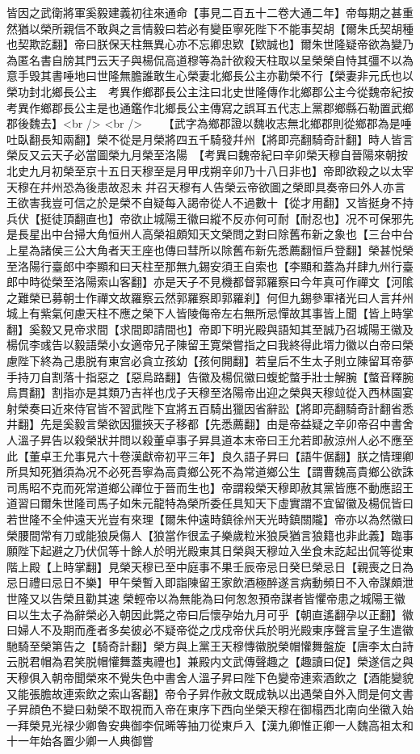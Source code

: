 皆因之武衛將軍奚毅建義初往來通命【事見二百五十二卷大通二年】帝每期之甚重然猶以榮所親信不敢與之言情毅曰若必有變臣寧死陛下不能事契胡【爾朱氏契胡種也契欺訖翻】帝曰朕保天柱無異心亦不忘卿忠欵【欵誠也】爾朱世隆疑帝欲為變乃為匿名書自牓其門云天子與楊侃高道穆等為計欲殺天柱取以呈榮榮自恃其彊不以為意手毁其書唾地曰世隆無膽誰敢生心榮妻北鄉長公主亦勸榮不行【榮妻非元氏也以榮功封北鄉長公主　考異作鄉郡長公主注曰北史世隆傳作北鄉郡公主今從魏帝紀按考異作鄉郡長公主是也通鑑作北鄉長公主傳寫之誤耳五代志上黨郡鄉縣石勒置武鄉郡後魏去】<br />
<br />
　　【武字為鄉郡證以魏收志無北鄉郡則從鄉郡為是唾吐臥翻長知兩翻】榮不從是月榮將四五千騎發幷州【將即亮翻騎奇計翻】時人皆言榮反又云天子必當圖榮九月榮至洛陽　【考異曰魏帝紀曰辛卯榮天穆自晉陽來朝按北史九月初榮至京十五日天穆至是月甲戌朔辛卯乃十八日非也】帝即欲殺之以太宰天穆在幷州恐為後患故忍未幷召天穆有人告榮云帝欲圖之榮即具奏帝曰外人亦言王欲害我豈可信之於是榮不自疑每入謁帝從人不過數十【從才用翻】又皆挺身不持兵伏【挺徒頂翻直也】帝欲止城陽王徽曰縱不反亦何可耐【耐忍也】况不可保邪先是長星出中台掃大角恒州人高榮祖頗知天文榮問之對曰除舊布新之象也【三台中台上星為諸侯三公大角者天王座也傳曰彗所以除舊布新先悉薦翻恒戶登翻】榮甚悦榮至洛陽行臺郎中李顯和曰天柱至那無九錫安須王自索也【李顯和蓋為幷肆九州行臺郎中時從榮至洛陽索山客翻】亦是天子不見機都督郭羅察曰今年真可作禪文【河隂之難榮已募朝士作禪文故羅察云然郭羅察即郭羅刹】何但九錫參軍禇光曰人言幷州城上有紫氣何慮天柱不應之榮下人皆陵侮帝左右無所忌憚故其事皆上聞【皆上時掌翻】奚毅又見帝求間【求間即請間也】帝即下明光殿與語知其至誠乃召城陽王徽及楊侃李彧告以毅語榮小女適帝兄子陳留王寛榮嘗指之曰我終得此壻力徽以白帝曰榮慮陛下終為己患脱有東宫必貪立孩幼【孩何開翻】若皇后不生太子則立陳留耳帝夢手持刀自割落十指惡之【惡烏路翻】告徽及楊侃徽曰蝮蛇螫手壯士解腕【螫音釋腕烏貫翻】割指亦是其類乃吉祥也戊子天穆至洛陽帝出迎之榮與天穆竝從入西林園宴射榮奏曰近來侍官皆不習武陛下宜將五百騎出獵因省辭訟【將即亮翻騎奇計翻省悉井翻】先是奚毅言榮欲因獵挾天子移都【先悉薦翻】由是帝益疑之辛卯帝召中書舍人溫子昇告以殺榮狀并問以殺董卓事子昇具道本末帝曰王允若即赦涼州人必不應至此【董卓王允事見六十卷漢獻帝初平三年】良久語子昇曰【語牛倨翻】朕之情理卿所具知死猶須為况不必死吾寧為高貴鄉公死不為常道鄉公生【謂曹魏高貴鄉公欲誅司馬昭不克而死常道鄉公禪位于晉而生也】帝謂殺榮天穆即赦其黨皆應不動應詔王道習曰爾朱世隆司馬子如朱元龍特為榮所委任具知天下虛實謂不宜留徽及楊侃皆曰若世隆不全仲遠天光豈有來理【爾朱仲遠時鎮徐州天光時鎮關隴】帝亦以為然徽曰榮腰間常有刀或能狼戾傷人【狼當作很孟子樂歲粒米狼戾猶言狼籍也非此義】臨事願陛下起避之乃伏侃等十餘人於明光殿東其日榮與天穆竝入坐食未訖起出侃等從東階上殿【上時掌翻】見榮天穆已至中庭事不果壬辰帝忌日癸巳榮忌日【親喪之日為忌日禮曰忌日不樂】甲午榮暫入即詣陳留王家飲酒極醉遂言病動頻日不入帝謀頗泄世隆又以告榮且勸其速榮輕帝以為無能為曰何怱怱預帝謀者皆懼帝患之城陽王徽曰以生太子為辭榮必入朝因此斃之帝曰后懷孕始九月可乎【朝直遙翻孕以正翻】徽曰婦人不及期而產者多矣彼必不疑帝從之戊戍帝伏兵於明光殿東序聲言皇子生遣徽馳騎至榮第告之【騎奇計翻】榮方與上黨王天穆慱徽脱榮帽懽舞盤旋【唐李太白詩云脱君帽為君笑脱帽懽舞蓋夷禮也】兼殿内文武傳聲趣之【趣讀曰促】榮遂信之與天穆俱入朝帝聞榮來不覺失色中書舍人溫子昇曰陛下色變帝連索酒飲之【酒能變貌又能張膽故連索飲之索山客翻】帝令子昇作赦文既成執以出遇榮自外入問是何文書子昇顔色不變曰勑榮不取視而入帝在東序下西向坐榮天穆在御榻西北南向坐徽入始一拜榮見光禄少卿魯安典御李侃晞等抽刀從東戶入【漢九卿惟正卿一人魏高祖太和十一年始各置少卿一人典御嘗
